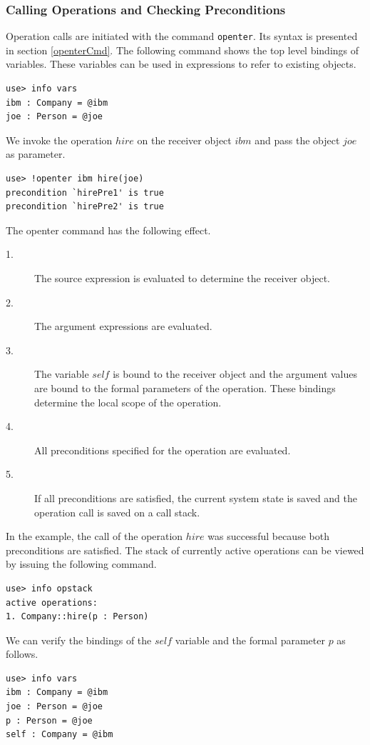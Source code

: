\documentclass[a4paper,titlepage,oneside,final]{scrreprt} %
\begin{document}
\subsubsection{Calling Operations and Checking Preconditions}
Operation calls are initiated with the command \verb+openter+. Its syntax is
presented in section \ref{openterCmd}.
The following command shows the top level bindings of variables.
These variables can be used in expressions to refer to existing objects.
\begin{verbatim}
use> info vars
ibm : Company = @ibm
joe : Person = @joe
\end{verbatim}
We invoke the operation $\mathit{hire}$ on the receiver object $\mathit{ibm}$ and pass the object
$\mathit{joe}$ as parameter.
\begin{verbatim}
use> !openter ibm hire(joe)
precondition `hirePre1' is true
precondition `hirePre2' is true
\end{verbatim}
The openter command has the following effect.
\begin{description}
\item[1.] The source expression is evaluated to determine the receiver object.
\item[2.] The argument expressions are evaluated.
\item[3.] The variable $\mathit{self}$ is bound to the receiver object and the argument
values are bound to the formal parameters of the operation.
These bindings determine the local scope of the operation.
\item[4.] All preconditions specified for the operation are evaluated.
\item[5.] If all preconditions are satisfied, the current
system state is saved and the operation call is saved on a call stack.
\end{description}
In the example, the call of the operation $\mathit{hire}$ was successful because
both preconditions are satisfied. The stack of currently active
operations can be viewed by issuing the following command.
\begin{verbatim}
use> info opstack
active operations:
1. Company::hire(p : Person)
\end{verbatim}
We can verify the bindings of the $\mathit{self}$ variable and the formal parameter $p$ as follows.
\begin{verbatim}
use> info vars
ibm : Company = @ibm
joe : Person = @joe
p : Person = @joe
self : Company = @ibm
\end{verbatim}
\end{document}
